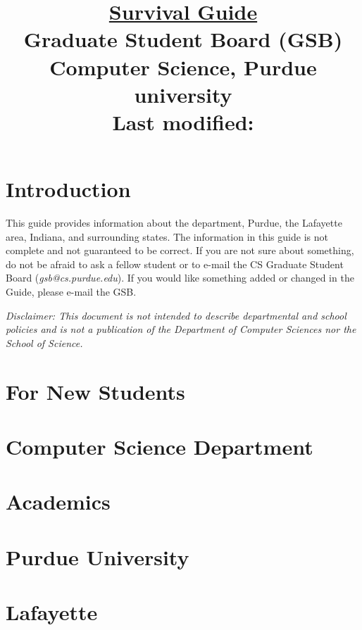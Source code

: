 \documentclass[letterpaper,10pt]{article}
\begin{document}
\date{}

\title{\huge \underline{Survival Guide} \\
Graduate Student Board (GSB) \\
Computer Science, Purdue university \\
\vspace{\baselineskip}
\large Last modified: \filemodprintdate{\jobname}}

\maketitle

\section{Introduction}
This guide provides information about the department, Purdue, the Lafayette area, Indiana, and surrounding states. The information in this guide is not complete and not guaranteed to be correct. If you are not sure about something, do not be afraid to ask a fellow student or to e-mail the CS Graduate Student Board (\emph{gsb@cs.purdue.edu}). If you would like something added or changed in the Guide, please e-mail the GSB.

\textit{Disclaimer: This document is not intended to describe departmental and school policies and is not a publication of the Department of Computer Sciences nor the School of Science.}

\pagebreak
\tableofcontents

\pagebreak

\pagebreak


\pagebreak
\section{For New Students}






\pagebreak
\section{Computer Science Department}




\pagebreak
\section{Academics}







\pagebreak
\section{Purdue University}





\pagebreak
\section{Lafayette}



\end{document}

